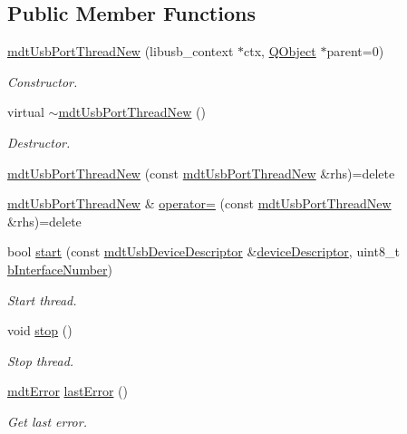 \subsection*{Public Member Functions}
\begin{DoxyCompactItemize}
\item 
\hyperlink{classmdt_usb_port_thread_new_a42db5d14d8102d5a05b484692b28f353}{mdt\-Usb\-Port\-Thread\-New} (libusb\-\_\-context $\ast$ctx, \hyperlink{class_q_object}{Q\-Object} $\ast$parent=0)
\begin{DoxyCompactList}\small\item\em Constructor. \end{DoxyCompactList}\item 
virtual \hyperlink{classmdt_usb_port_thread_new_a1f08c280502406418093be95e85415bc}{$\sim$mdt\-Usb\-Port\-Thread\-New} ()
\begin{DoxyCompactList}\small\item\em Destructor. \end{DoxyCompactList}\item 
\hyperlink{classmdt_usb_port_thread_new_a28beaed16b04754a158e3ed4b921ff03}{mdt\-Usb\-Port\-Thread\-New} (const \hyperlink{classmdt_usb_port_thread_new}{mdt\-Usb\-Port\-Thread\-New} \&rhs)=delete
\item 
\hyperlink{classmdt_usb_port_thread_new}{mdt\-Usb\-Port\-Thread\-New} \& \hyperlink{classmdt_usb_port_thread_new_a61525f464e0dc79c69afce302ef711b0}{operator=} (const \hyperlink{classmdt_usb_port_thread_new}{mdt\-Usb\-Port\-Thread\-New} \&rhs)=delete
\item 
bool \hyperlink{classmdt_usb_port_thread_new_ac0b2946c973dddcbb19dd26941df2ca5}{start} (const \hyperlink{classmdt_usb_device_descriptor}{mdt\-Usb\-Device\-Descriptor} \&\hyperlink{classmdt_usb_port_thread_new_a26e376f505b24f796e485361b4f36740}{device\-Descriptor}, uint8\-\_\-t \hyperlink{classmdt_usb_port_thread_new_a473cc8ad9fa93d9c5a94b2f700a5311d}{b\-Interface\-Number})
\begin{DoxyCompactList}\small\item\em Start thread. \end{DoxyCompactList}\item 
void \hyperlink{classmdt_usb_port_thread_new_a10437cf919cc678a8aae348763ee682d}{stop} ()
\begin{DoxyCompactList}\small\item\em Stop thread. \end{DoxyCompactList}\item 
\hyperlink{classmdt_error}{mdt\-Error} \hyperlink{classmdt_usb_port_thread_new_aec47aab80aaaea81cd1b8eb4dfc1bda3}{last\-Error} ()
\begin{DoxyCompactList}\small\item\em Get last error. \end{DoxyCompactList}\end{DoxyCompactItemize}
